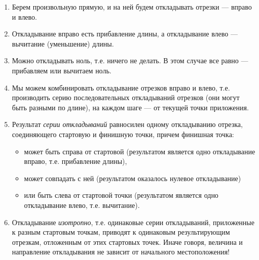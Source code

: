 \begin{enumerate}\setlength{\itemsep}{1pt}
\item Берем произвольную прямую, и на ней будем откладывать отрезки --- вправо и влево.
\item Откладывание вправо есть прибавление длины, а откладывание влево --- вычитание (уменьшение) длины.
\item Можно откладывать ноль, т.е. ничего не делать. В этом случае все равно --- прибавляем или вычитаем ноль.
\item Мы можем комбинировать откладывание отрезков вправо и влево, т.е. производить серию последовательных откладываний отрезков (они могут быть разными по длине), на каждом шаге --- от текущей точки приложения.
\item Результат \textit{серии откладываний} равносилен одному откладыванию отрезка, соединяющего стартовую и финишную точки, причем финишная точка:
\begin{itemize}
\item может быть справа от стартовой (результатом является одно откладывание вправо, т.е. прибавление длины),
\item может совпадать с ней (результатом оказалось нулевое откладывание)
\item или быть слева от стартовой точки (результатом является одно откладывание влево, т.е. вычитание).
\end{itemize}
\item Откладывание \textit{изотропно}, т.е. одинаковые серии откладываний, приложенные к разным стартовым точкам, приводят к одинаковым результирующим отрезкам, отложенным от этих стартовых точек. Иначе говоря, величина и направление откладывания не зависит от начального местоположения!
\end{enumerate}
